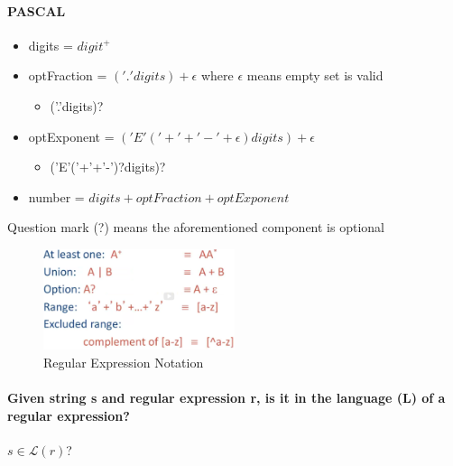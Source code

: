 \documentclass[a4paper, 10pt]{article}
\begin{document}
\paragraph{PASCAL}
\begin{itemize}
	\item digits = $digit^+$
	\item optFraction = $('.'digits) + \epsilon $ where $\epsilon$ means empty set is valid
	      \begin{itemize}
		      \item ('.'digits)?
	      \end{itemize}
	\item optExponent = $('E' ('+' + '-' + \epsilon) digits) + \epsilon$
	      \begin{itemize}
		      \item ('E'('+'+'-')?digits)?
	      \end{itemize}
	\item number = $digits + optFraction + optExponent$
\end{itemize}
Question mark (?) means the aforementioned component is optional
\begin{figure}[ht]
	\centering
	\includegraphics[width=0.5\textwidth]{lexicalSpec.png}
	\caption{Regular Expression Notation}
\end{figure}
\paragraph{Given string s and regular expression r, is it in the language (L) of a regular expression?}
$s \in \mathcal{L}(r)$?
\end{document}
